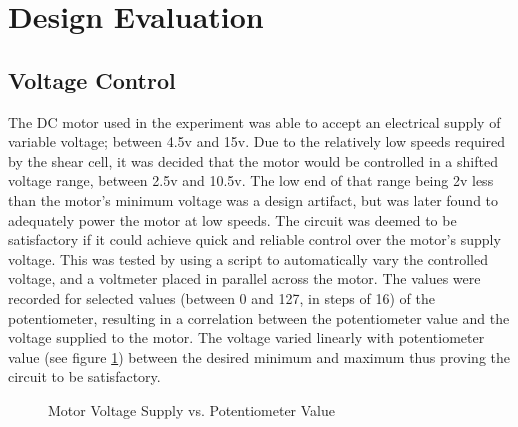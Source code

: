 \documentclass[twoside,a4]{report}
\begin{document}
	\section{Design Evaluation}
	
	\subsection{Voltage Control} %
	The DC motor used in the experiment was able to accept an electrical supply of variable voltage; between 4.5v and 15v. Due to the relatively low speeds required by the shear cell, it was decided that the motor would be controlled in a shifted voltage range, between 2.5v and 10.5v. 
The low end of that range being 2v less than the motor's minimum voltage was a design artifact, but was later found to adequately power the motor at low speeds. %
The circuit was deemed to be satisfactory if it could achieve quick and reliable control over the motor's supply voltage. This was tested by using a script to automatically vary the controlled voltage, and a voltmeter placed in parallel across the motor. The values were recorded for selected values (between 0 and 127, in steps of 16) of the potentiometer, resulting in a correlation between the potentiometer value and the voltage supplied to the motor. The voltage varied linearly with potentiometer value (see figure \ref{figvoltvval}) between the desired minimum and maximum thus proving the circuit to be satisfactory.
	\begin{figure}[!htb]
		\centering
		\caption{Motor Voltage Supply vs. Potentiometer Value}
		\label{figvoltvval}
	\end{figure} \newline  \noindent
\end{document}
